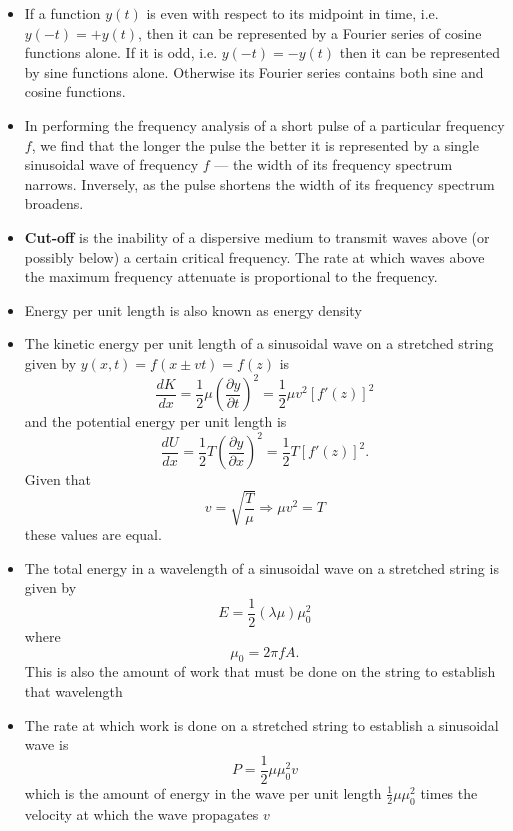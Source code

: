 \documentclass{article}
\begin{document}
\begin{itemize}
  \item If a function $y(t)$ is even with respect to its midpoint in time, i.e. $y(-t) = +y(t)$, then it can be represented by a Fourier series of cosine functions alone. If it is odd, i.e. $y(-t) = -y(t)$ then it can be represented by sine functions alone. Otherwise its Fourier series contains both sine and cosine functions.

  \item In performing the frequency analysis of a short pulse of a particular frequency $f$, we find that the longer the pulse the better it is represented by a single sinusoidal wave of frequency $f$ — the width of its frequency spectrum narrows. Inversely, as the pulse shortens the width of its frequency spectrum broadens.

  \item \textbf{Cut-off} is the inability of a dispersive medium to transmit waves above (or possibly below) a certain critical frequency. The rate at which waves above the maximum frequency attenuate is proportional to the frequency.

  \item Energy per unit length is also known as energy density

  \item The kinetic energy per unit length of a sinusoidal wave on a stretched string given by $y(x, t) = f(x \pm vt) = f(z)$ is \[\frac{d K}{d x} = \frac{1}{2} \mu \left( \frac{\partial y}{\partial t} \right)^2 = \frac{1}{2} \mu v^2 [f'(z)]^2\] and the potential energy per unit length is \[\frac{d U}{d x} = \frac{1}{2} T \left( \frac{\partial y}{\partial x} \right)^2 = \frac{1}{2} T [f'(z)]^2.\] Given that \[v = \sqrt{\frac{T}{\mu}} \Rightarrow \mu v^2 = T\] these values are equal.

  \item The total energy in a wavelength of a sinusoidal wave on a stretched string is given by \[E = \frac{1}{2} (\lambda \mu) \mu_0^2\] where \[\mu_0 = 2 \pi f A.\] This is also the amount of work that must be done on the string to establish that wavelength

  \item The rate at which work is done on a stretched string to establish a sinusoidal wave is \[P = \frac{1}{2} \mu \mu_0^2 v\] which is the amount of energy in the wave per unit length $\frac{1}{2} \mu \mu_0^2$ times the velocity at which the wave propagates $v$
\end{itemize}
\end{document}
